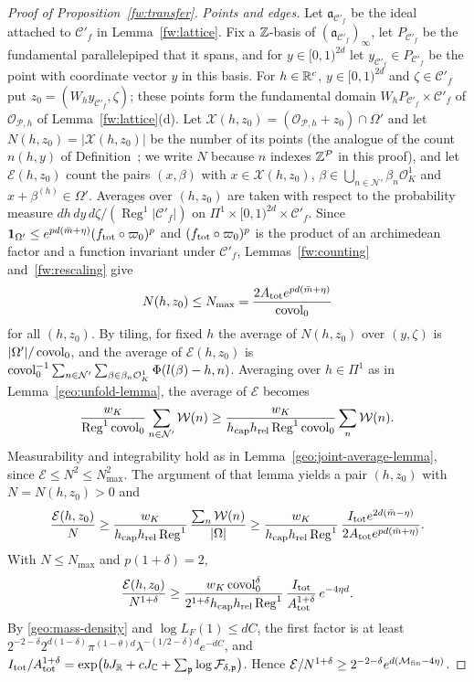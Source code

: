 \begin{proof}[Proof of Proposition~\ref{fw:transfer}]
\emph{Points and edges.} Let $\mathfrak a_{\mathcal C'_f}$ be the ideal attached to
$\mathcal C'_f$ in Lemma~\ref{fw:lattice}. Fix a $\mathbb Z$-basis of
$(\mathfrak a_{\mathcal C'_f})_\infty$, let $P_{\mathcal C'_f}$ be the fundamental
parallelepiped that it spans, and for $y\in[0,1)^{2d}$ let
$y_{\mathcal C'_f}\in P_{\mathcal C'_f}$ be the point with coordinate
vector $y$ in this basis. For $h\in\mathbb R^c$, $y\in[0,1)^{2d}$ and
$\zeta\in\mathcal C'_f$ put $z_0=(W_hy_{\mathcal C'_f},\zeta)$; these
points form the fundamental domain $W_hP_{\mathcal C'_f}\times\mathcal
C'_f$ of $\mathcal O_{\mathcal P,h}$ of Lemma~\ref{fw:lattice}(d). Let
$\mathcal X(h,z_0)=(\mathcal O_{\mathcal P,h}+z_0)\cap\Omega'$ and let
$N(h,z_0)=|\mathcal X(h,z_0)|$ be the number of its points (the analogue
of the count $n(h,y)$ of Definition~; we write $N$ because $n$
indexes $\mathbb Z^{\mathcal P}$ in this proof), and let
$\mathcal E(h,z_0)$ count the pairs $(x,\beta)$ with
$x\in\mathcal X(h,z_0)$, $\beta\in\bigcup_{n\in\mathcal N'}\beta_n\mathcal
O_K^1$ and $x+\beta^{(h)}\in\Omega'$. Averages over $(h,z_0)$ are taken
with respect to the probability measure
$dh\,dy\,d\zeta/(\operatorname{Reg}^1|\mathcal C'_f|)$ on
$\Pi^1\times[0,1)^{2d}\times\mathcal C'_f$. Since
$\mathbf 1_{\Omega'}\le e^{pd(\bar m+\eta)}(f_{\rm tot}\circ\varpi_0)^p$ and
$(f_{\rm tot}\circ\varpi_0)^p$ is the product of an archimedean factor and a
function invariant under $\mathcal C'_f$, Lemmas~\ref{fw:counting}
and~\ref{fw:rescaling} give
\[
 N(h,z_0)\le N_{\max}=\frac{2A_{\rm tot}e^{pd(\bar m+\eta)}}{\operatorname{covol}_0}
\]
for all $(h,z_0)$. By tiling, for fixed $h$ the average of $N(h,z_0)$
over $(y,\zeta)$ is $|\Omega'|/\operatorname{covol}_0$, and the average of
$\mathcal E(h,z_0)$ is
$\operatorname{covol}_0^{-1}\sum_{n\in\mathcal N'}\sum_{\beta\in\beta_n\mathcal O_K^1}
\Phi(l(\beta)-h,n)$. Averaging over $h\in\Pi^1$ as in
Lemma~\ref{geo:unfold-lemma}, the average of $\mathcal E$ becomes
\[
 \frac{w_K}{\operatorname{Reg}^1\operatorname{covol}_0}\sum_{n\in\mathcal N'}\mathcal W(n)
 \ge\frac{w_K}{h_{\rm cap}h_{\rm rel}\operatorname{Reg}^1\operatorname{covol}_0}
 \sum_n\mathcal W(n).
\]
Measurability and integrability hold as in
Lemma~\ref{geo:joint-average-lemma}, since $\mathcal E\le N^2\le
N_{\max}^2$. The argument of that lemma yields a pair $(h,z_0)$ with
$N=N(h,z_0)>0$ and
\[
 \frac{\mathcal E(h,z_0)}N\ge\frac{w_K}{h_{\rm cap}h_{\rm rel}
 \operatorname{Reg}^1}\,\frac{\sum_n\mathcal W(n)}{|\Omega|}
 \ge\frac{w_K}{h_{\rm cap}h_{\rm rel}\operatorname{Reg}^1}\,
 \frac{I_{\rm tot}e^{2d(\bar m-\eta)}}{2A_{\rm tot}e^{pd(\bar m+\eta)}} .
\]
With $N\le N_{\max}$ and $p(1+\delta)=2$,
\[
 \frac{\mathcal E(h,z_0)}{N^{1+\delta}}\ge
 \frac{w_K\operatorname{covol}_0^\delta}{2^{1+\delta}h_{\rm cap}h_{\rm rel}
 \operatorname{Reg}^1}\,\frac{I_{\rm tot}}{A_{\rm tot}^{1+\delta}}\,e^{-4\eta d}.
\]
By \eqref{geo:mass-density} and $\log L_F(1)\le dC$, the first factor
is at least
$2^{-2-\delta}2^{d(1-\delta)}\pi^{(1-\theta)d}\lambda^{-(1/2-\delta)d}e^{-dC}$,
and $I_{\rm tot}/A_{\rm tot}^{1+\delta}=\exp\bigl(bJ_\mathbb R+cJ_\mathbb C+\sum_{\mathfrak p}\log\mathcal
F_{\delta,\mathfrak p}\bigr)$. Hence
$\mathcal E/N^{1+\delta}\ge2^{-2-\delta}e^{d(\mathcal M_{\rm
fin}-4\eta)}$.


\end{proof}
